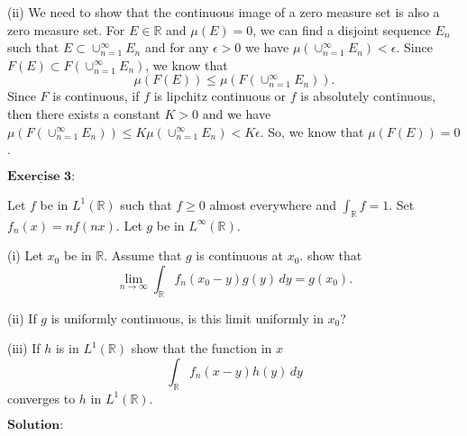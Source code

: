 \documentclass[12pt,a4paper]{ctexart}
\begin{document}
(ii) We need to show that the continuous image of a zero measure set is also a zero measure set. For $E \in \mathbb{R}$ and $\mu(E) = 0$, we can find a disjoint sequence ${E_{n}}$ such that $E \subset \cup_{n=1}^{\infty} E_{n}$ and for any $\epsilon > 0$ we have $\mu(\cup_{n=1}^{\infty} E_{n}) < \epsilon$. Since $F(E) \subset F(\cup_{n=1}^{\infty} E_{n}) $, we know that
\begin{equation*}
    \mu(F(E)) \leq \mu(F(\cup_{n=1}^{\infty} E_{n})) .
\end{equation*}
Since $F$ is continuous, if $f$ is lipchitz continuous or $f$ is absolutely continuous, then there exists a constant $K > 0$ and we have $\mu(F(\cup_{n=1}^{\infty} E_{n}))  \leq K \mu(\cup_{n=1}^{\infty} E_{n}) < K \epsilon$. So, we know that $\mu(F(E)) = 0$.
 
\newpage

$\underline{\textbf{Exercise 3:}}$

Let $f$ be in $L^{1}(\mathbb{R})$ such that $f \geq 0$ almost everywhere and $\int_{\mathbb{R}}^{} f = 1$. Set $f_{n} (x) = n f(n x)$. Let $g$ be in $L^{\infty}(\mathbb{R})$.

(i) Let $x_{0}$ be in $\mathbb{R}$. Assume that $g$ is continuous at $x_{0}$. show that
\begin{equation*}
   \lim_{n \to \infty} \int_{\mathbb{R}}^{} f_{n}(x_{0} - y) g(y) \, d y = g(x_{0}).
\end{equation*}

(ii) If $g$ is uniformly continuous, is this limit uniformly in $x_{0}$?

(iii) If $h$ is in $L^{1}(\mathbb{R})$ show that the function in $x$
\begin{equation*}
    \int_{\mathbb{R}}^{} f_{n} (x - y) h(y) \, d y
\end{equation*}
converges to $h$ in $L^{1}(\mathbb{R})$.

\vspace{8pt}
$\textbf{Solution:}$
\end{document}
